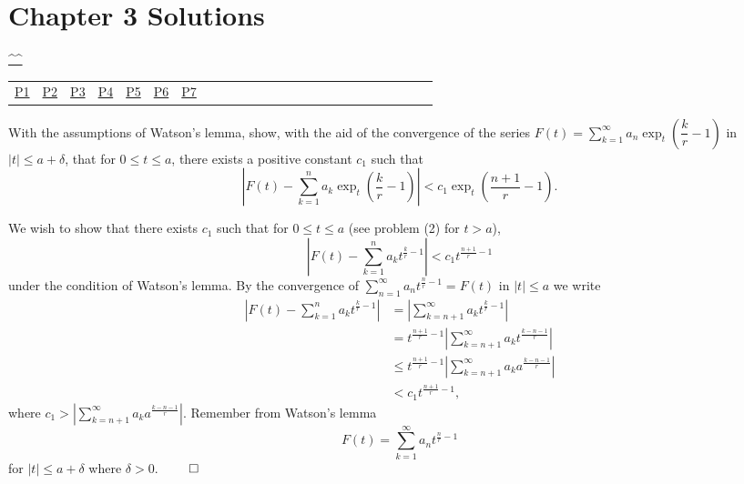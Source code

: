 \section{Chapter 3 Solutions}
\begin{center}\hyperref[toc]{\^{}\^{}}\end{center}
\setcounter{problem}{0}
\setcounter{solution}{0}
\begin{center}\begin{tabular}{lllllllllllllllllllllllll}
\hyperref[problem1chapter3]{P1} & \hyperref[problem2chapter3]{P2} & \hyperref[problem3chapter3]{P3} & \hyperref[problem4chapter3]{P4} & \hyperref[problem5chapter3]{P5} & \hyperref[problem6chapter3]{P6} & \hyperref[problem7chapter3]{P7}
\end{tabular}\end{center}
\begin{problem}\label{problem1chapter3}
With the assumptions of Watson's lemma, show, with the aid of the convergence of the series $F(t) = \displaystyle\sum_{k=1}^{\infty} a_n \exp_t \left( \dfrac{k}{r} - 1 \right)$ in $|t| \leq a + \delta$, that for $0 \leq t \leq a$, there exists a positive constant $c_1$ such that 
$$\left| F(t) - \displaystyle\sum_{k=1}^n a_k \exp_t \left(\dfrac{k}{r} - 1 \right) \right| < c_1 \exp_t \left( \dfrac{n+1}{r} - 1 \right).$$
\end{problem}
\begin{solution}
We wish to show that there exists $c_1$ such that for $0 \leq t \leq a$ (see problem (2) for $t > a$), 
$$\left| F(t) - \displaystyle\sum_{k=1}^n a_kt^{\frac{k}{r}-1} \right| < c_1 t^{\frac{n+1}{r} - 1}$$
under the condition of Watson's lemma. 
By the convergence of $\displaystyle\sum_{n=1}^{\infty} a_n t^{\frac{n}{r}-1} = F(t)$ in $|t| \leq a$ we write
$$\begin{array}{ll}
\left| F(t) - \displaystyle\sum_{k=1}^n a_k t^{\frac{k}{r}-1} \right| &= \left| \displaystyle\sum_{k=n+1}^{\infty} a_k t^{\frac{k}{r}-1} \right| \\
&= t^{\frac{n+1}{r}-1} \left| \displaystyle\sum_{k=n+1}^{\infty} a_k t^{\frac{k-n-1}{r}} \right| \\
&\leq t^{\frac{n+1}{r}-1} \left| \displaystyle\sum_{k=n+1}^{\infty} a_k a^{\frac{k-n-1}{r}} \right| \\
&< c_1  t^{\frac{n+1}{r}-1},
\end{array}$$
where $c_1 > \left|\displaystyle\sum_{k=n+1}^{\infty} a_k a^{\frac{k-n-1}{r}} \right|$.
Remember from Watson's lemma
$$F(t) = \displaystyle\sum_{k=1}^{\infty} a_n t^{\frac{n}{r}-1}$$
for $|t| \leq a+\delta$ where $\delta > 0.$ $\qed$
\end{solution}
